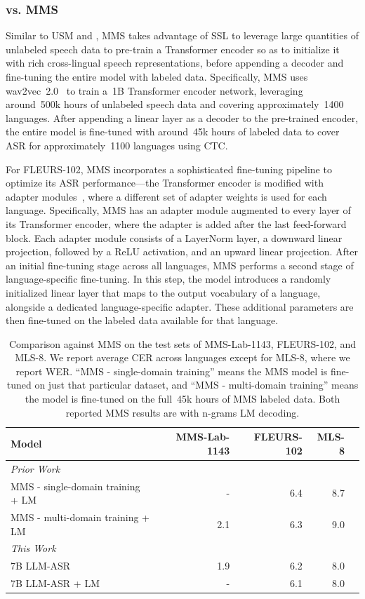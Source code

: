 \documentclass[]{fairmeta}
\begin{document}
\subsubsection{\OmniASR vs. MMS}
Similar to USM and \OmniASR, MMS \citep{pratap2024scaling} takes advantage of SSL to leverage large quantities of unlabeled speech data to pre-train a Transformer encoder so as to initialize it with rich cross-lingual speech representations, before appending a decoder and fine-tuning the entire model with labeled data. Specifically, MMS uses wav2vec~2.0~\citep{baevski2020wav2vec} to train a~1B Transformer encoder network, leveraging around~500k hours of unlabeled speech data and covering approximately~1400 languages. After appending a linear layer as a decoder to the pre-trained encoder, the entire model is fine-tuned with around~45k hours of labeled data to cover ASR for approximately~1100 languages using CTC.

For FLEURS-102, MMS incorporates a sophisticated fine-tuning pipeline to optimize its ASR performance—the Transformer encoder is modified with adapter modules~\citep{houlsby2019parameter}, where a different set of adapter weights is used for each language. Specifically, MMS has an adapter module augmented to every layer of its Transformer encoder, where the adapter is added after the last feed-forward block. Each adapter module consists of a LayerNorm layer, a downward linear projection, followed by a ReLU activation, and an upward linear projection.
After an initial fine-tuning stage across all languages, MMS performs a second stage of language-specific fine-tuning. In this step, the model introduces a randomly initialized linear layer that maps to the output vocabulary of a language, alongside a dedicated language-specific adapter. These additional parameters are then fine-tuned on the labeled data available for that language.

\begin{table}[htbp]
  \centering
  \begin{tabular}{lrrrr}
    \toprule
    Model & MMS-Lab-1143 & FLEURS-102 & MLS-8\\
    \midrule
    \textit{Prior Work} \\
    MMS - single-domain training + LM   &   -    &  6.4   &  8.7  \\
    MMS - multi-domain training + LM    &  2.1   &  6.3   &  9.0  \\
    \midrule
    \textit{This Work}  \\
    7B LLM-ASR                          &  1.9   &  6.2   &  8.0  \\
    7B LLM-ASR + LM                     &   -    &  6.1   &  8.0  \\
    \bottomrule
  \end{tabular}
  \caption{Comparison against MMS on the test sets of MMS-Lab-1143, FLEURS-102, and MLS-8. We report average CER across languages except for MLS-8, where we report WER. ``MMS - single-domain training'' means the MMS model is fine-tuned on just that particular dataset, and ``MMS - multi-domain training'' means the model is fine-tuned on the full~45k hours of MMS labeled data. Both reported MMS results are with n-grams LM decoding.}
  \label{tab:vs_mms}
\end{table}
\end{document}
